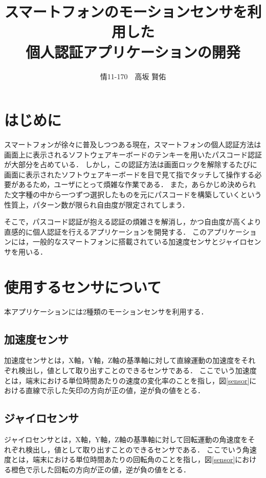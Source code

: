 \documentclass[11pt]{jreport}
\title{\bfseries スマートフォンのモーションセンサを利用した\\個人認証アプリケーションの開発}
\author{情11-170　高坂 賢佑}
\date{}
\begin{document}
\maketitle

\tableofcontents
\listoffigures

\chapter*{はじめに}
スマートフォンが徐々に普及しつつある現在，スマートフォンの個人認証方法は画面上に表示されるソフトウェアキーボードのテンキーを用いたパスコード認証が大部分を占めている．
しかし，この認証方法は画面ロックを解除するたびに画面に表示されたソフトウェアキーボードを目で見て指でタッチして操作する必要があるため，ユーザにとって煩雑な作業である．
また，あらかじめ決められた文字種の中から一つずつ選択したものを元にパスコードを構築していくという性質上，パターン数が限られ自由度が限定されてしまう．

そこで，パスコード認証が抱える認証の煩雑さを解消し，かつ自由度が高くより直感的に個人認証を行えるアプリケーションを開発する．
このアプリケーションには，一般的なスマートフォンに搭載されている加速度センサとジャイロセンサを用いる．

\chapter{使用するセンサについて}
本アプリケーションには2種類のモーションセンサを利用する．

	\section{加速度センサ}
	加速度センサとは，X軸，Y軸，Z軸の基準軸に対して直線運動の加速度をそれぞれ検出し，値として取り出すことのできるセンサである．
	ここでいう加速度とは，端末における単位時間あたりの速度の変化率のことを指し，図\ref{sensor}における直線で示した矢印の方向が正の値，逆が負の値をとる．
	
	\section{ジャイロセンサ}
	ジャイロセンサとは，X軸，Y軸，Z軸の基準軸に対して回転運動の角速度をそれぞれ検出し，値として取り出すことのできるセンサである．
    ここでいう角速度とは，端末における単位時間あたりの回転角のことを指し，図\ref{sensor}における橙色で示した回転の方向が正の値，逆が負の値をとる．
\end{document}
